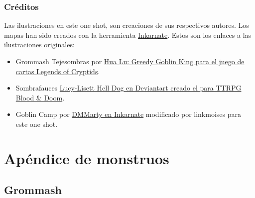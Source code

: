\documentclass[10pt,twoside,twocolumn,openany]{dndbook}
\begin{document}
\section{Créditos}

Las ilustraciones en este one shot, son creaciones de sus respectivos autores. Los mapas han sido 
creados con la herramienta \href{https://inkarnate.com/}{Inkarnate}. Estos son los enlaces a las 
ilustraciones originales:

\begin{itemize}
  \item Grommash Tejesombras por \href{https://legendofthecryptids.fandom.com/wiki/Greedy_Goblin_King}{Hua Lu: Greedy Goblin King para el juego de cartas Legends of Cryptids}.
  \item Sombrafauces \href{https://www.deviantart.com/lucy-lisett/art/Death-Dog-901248620}{Lucy-Lisett Hell Dog en Deviantart creado el para TTRPG Blood \& Doom}.
  \item Goblin Camp por \href{https://inkarnate.com/m/zkNwn5--goblin-camp/}{DMMarty en Inkarnate} modificado por linkmoises para este one shot.
\end{itemize}

\part*{Apéndice de monstruos}

\chapter*{Grommash}
\end{document}
